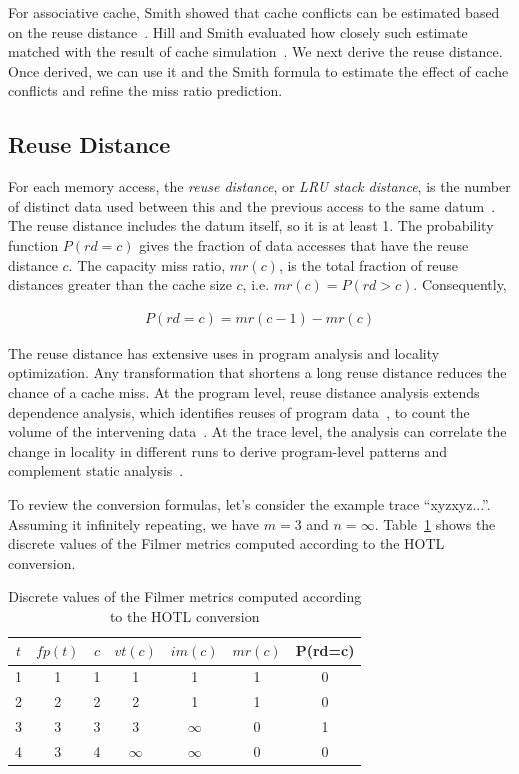 For associative cache, Smith showed that cache conflicts can be
estimated based on the reuse distance~\cite{Smith:ICSE76}.  Hill and Smith
evaluated how closely such estimate matched with the result of cache
simulation~\cite{HillS:TOC89}.  We next derive the reuse distance.
Once derived, we can use it and the Smith formula to estimate the
effect of cache conflicts and refine the miss ratio prediction.

\subsection{Reuse Distance}

For each memory access, the {\em reuse distance}, or \emph{LRU stack
  distance}, is the number of distinct data used between this and the
previous access to the same datum~\cite{Mattson+:IBM70}.  The reuse
distance includes the datum itself, so it is at least 1. The
probability function $P(rd=c)$ gives the fraction of data accesses
that have the reuse distance $c$.  The capacity miss ratio, $mr(c)$,
is the total fraction of reuse distances greater than the cache size
$c$, i.e. $mr(c)=P(rd > c)$. Consequently, 

\begin{align*}
P(rd=c) = mr(c-1) - mr(c)
\end{align*}

The reuse distance has extensive uses in program analysis and locality
optimization.  Any transformation that shortens a long reuse distance
reduces the chance of a cache miss. At the program level, reuse
distance analysis extends dependence analysis, which identifies reuses
of program data~\cite{AllenK:Book01}, to count the volume of the
intervening data~\cite{CascavalP:ICS03,BeylsD:JSA05,ChauhanS:ICS10}.
At the trace level, the analysis can correlate the change in locality
in different runs to derive program-level patterns and complement
static analysis~\cite{Zhong+:TOPLAS09,MarinM:SIGMETRICS04,Fang+:CC06}.

\bigskip
To review the conversion formulas, let's consider the example trace
``xyzxyz...''.  Assuming it infinitely repeating, we have $m=3$ and
$n=\infty$.  Table~\ref{tbl:filmer-eg} shows the discrete values of
the Filmer metrics computed according to the HOTL conversion.

\begin{table}
\centering
\begin{tabular}{|cc|ccccc|}
\hline
$t$ & $fp(t)$ & $c$ & $vt(c)$ & $im(c)$ & $mr(c)$ & P(rd=c) \\ \hline
1 & 1 & 1 & 1 & 1 & 1 & 0\\
2 & 2 & 2 & 2 & 1 & 1 & 0  \\
3 & 3 & 3 & 3 & $\infty$ & 0 & 1 \\
4 & 3 & 4 & $\infty$ & $\infty$ & 0 & 0\\ \hline 
\end{tabular}
\caption{Discrete values of the Filmer metrics computed according to
  the HOTL conversion}
\label{tbl:filmer-eg}
\end{table}

